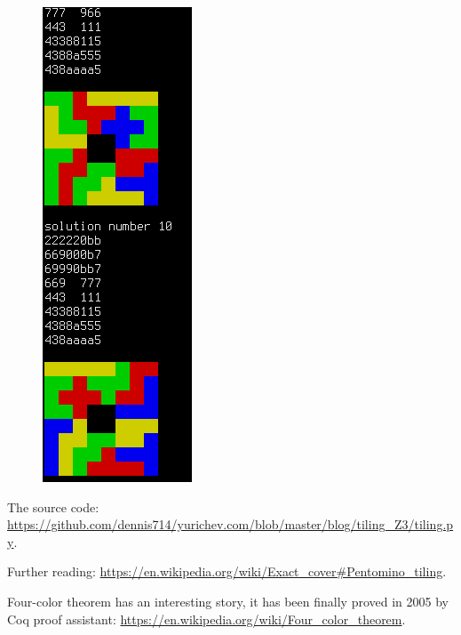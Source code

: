 \begin{figure}[H]
\centering
\includegraphics[scale=1]{SMT/tiling/big2.png}
\caption{}
\end{figure}

The source code: \url{https://github.com/dennis714/yurichev.com/blob/master/blog/tiling_Z3/tiling.py}.

Further reading: \url{https://en.wikipedia.org/wiki/Exact_cover#Pentomino_tiling}.

Four-color theorem has an interesting story, it has been finally proved in 2005 by Coq proof assistant:
\url{https://en.wikipedia.org/wiki/Four_color_theorem}.


